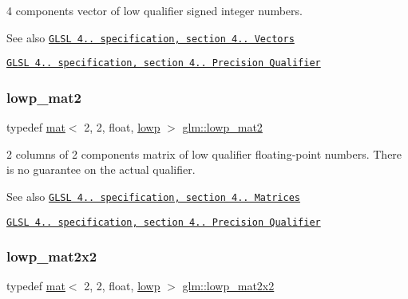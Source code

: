 4 components vector of low qualifier signed integer numbers.

\begin{DoxySeeAlso}{See also}
\href{http://www.opengl.org/registry/doc/GLSLangSpec.4.20.8.pdf}{\tt G\+L\+SL 4.. specification, section 4.. Vectors} 

\href{http://www.opengl.org/registry/doc/GLSLangSpec.4.20.8.pdf}{\tt G\+L\+SL 4.. specification, section 4.. Precision Qualifier} 
\end{DoxySeeAlso}
\mbox{\label{group__core__precision_ga786e43e2a310fa4bddba3e41b786aa82}} 
\subsubsection{\texorpdfstring{lowp\+\_\+mat2}{lowp\_mat2}}
{\footnotesize\ttfamily typedef \hyperlink{structglm_1_1mat}{mat}$<$ 2, 2, float, \hyperlink{namespaceglm_a36ed105b07c7746804d7fdc7cc90ff25ae161af3fc695e696ce3bf69f7332bc2d}{lowp} $>$ \hyperlink{group__core__precision_ga786e43e2a310fa4bddba3e41b786aa82}{glm\+::lowp\+\_\+mat2}}

2 columns of 2 components matrix of low qualifier floating-\/point numbers. There is no guarantee on the actual qualifier.

\begin{DoxySeeAlso}{See also}
\href{http://www.opengl.org/registry/doc/GLSLangSpec.4.20.8.pdf}{\tt G\+L\+SL 4.. specification, section 4.. Matrices} 

\href{http://www.opengl.org/registry/doc/GLSLangSpec.4.20.8.pdf}{\tt G\+L\+SL 4.. specification, section 4.. Precision Qualifier} 
\end{DoxySeeAlso}
\mbox{\label{group__core__precision_gaab9064a0fd0e3ac8d4ae8ceb2dc4fe56}} 
\subsubsection{\texorpdfstring{lowp\+\_\+mat2x2}{lowp\_mat2x2}}
{\footnotesize\ttfamily typedef \hyperlink{structglm_1_1mat}{mat}$<$ 2, 2, float, \hyperlink{namespaceglm_a36ed105b07c7746804d7fdc7cc90ff25ae161af3fc695e696ce3bf69f7332bc2d}{lowp} $>$ \hyperlink{group__core__precision_gaab9064a0fd0e3ac8d4ae8ceb2dc4fe56}{glm\+::lowp\+\_\+mat2x2}}

